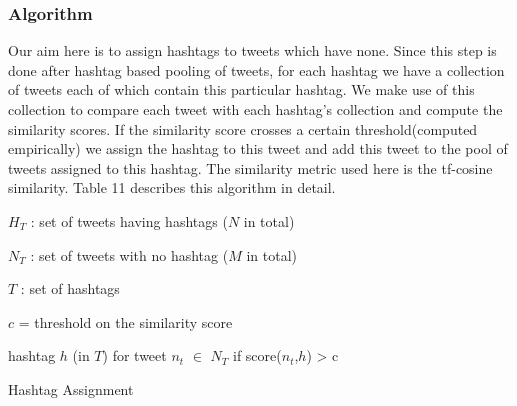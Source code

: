 \documentclass[10pt,a5paper,twoside]{article}
\newcommand{\var}{v}
\begin{document}
\subsubsection{Algorithm}
Our aim here is to assign hashtags to tweets which have none. Since this step is done after hashtag based pooling of tweets, for each hashtag we have a collection of tweets each of which contain this particular hashtag. We make use of this collection to compare each tweet with each hashtag's collection and compute the similarity scores. If the similarity score crosses a certain threshold(computed empirically) we assign the hashtag to this tweet and add this tweet to the pool of tweets assigned to this hashtag. The similarity metric used here is the tf-cosine similarity. Table 11 describes this algorithm in detail.\\



\incmargin{1.5em}
\linesnumbered
\begin{algorithm}[hb!]
\dontprintsemicolon

\Input
{
$H_T$ : set of tweets having hashtags ($N$ in total)
 
$N_T$ : set of tweets with no hashtag ($M$ in total)
 
$T$ : set of hashtags
 
$c$ = threshold on the similarity score
}
\Output
{
hashtag $h$ (in $T$) for tweet $n_t$ $\in$ $N_T$ if score($n_t$,$h$) > c
}
\BlankLine
{\small
{}
}
\caption{{\sc Hashtag Assignment} \label{alg:tagassign}}
\end{algorithm}
\decmargin{1.5em}
\end{document}
